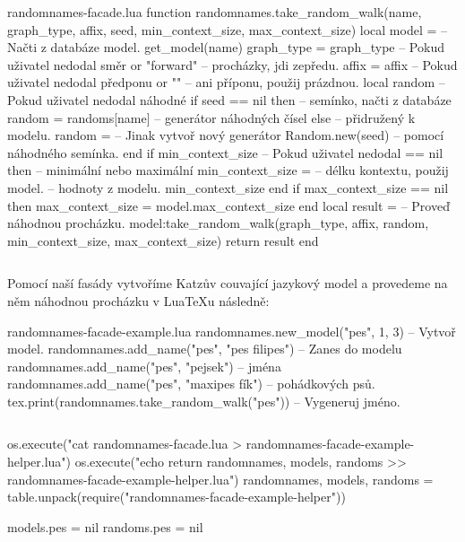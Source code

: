 \documentclass{csbulletin}
\let\exampleoutput\emph
\newcommand\myinputminted[3][]{%
  \inputminted[#1]{#2}{#3}%
}
\newcommand\myinputminted[3][]{%
  \inputminted[#1]{#2}{code-placeholder.#2}%
}
\begin{document}
\begin{filecontents}{randomnames-facade.lua}
function randomnames.take_random_walk(name, graph_type,
                                      affix, seed,
                                      min_context_size,
                                      max_context_size)
  local model =             -- Načti z databáze model.
    get_model(name)
  graph_type = graph_type   -- Pokud uživatel nedodal směr
            or "forward"    -- procházky, jdi zepředu.
  affix = affix             -- Pokud uživatel nedodal předponu
        or ""               -- ani příponu, použij prázdnou.
  local random              -- Pokud uživatel nedodal náhodné
  if seed == nil then       -- semínko, načti z databáze
    random = randoms[name]  -- generátor náhodných čísel
  else                      -- přidružený k modelu.
    random =                -- Jinak vytvoř nový generátor
      Random.new(seed)      -- pomocí náhodného semínka.
  end
  if min_context_size       -- Pokud uživatel nedodal
       == nil then          -- minimální nebo maximální
     min_context_size =     -- délku kontextu, použij
       model.               -- hodnoty z modelu.
         min_context_size
  end
  if max_context_size == nil then
     max_context_size = model.max_context_size
  end
  local result =            -- Proveď náhodnou procházku.
    model:take_random_walk(graph_type, affix, random,
                           min_context_size,
                           max_context_size)
  return result
end
\end{filecontents}
\myinputminted{lua}{randomnames-facade.lua}

Pomocí naší fasády vytvoříme Katzův couvající jazykový model a provedeme na něm náhodnou procházku v Lua\TeX u následně:

\begin{filecontents}{randomnames-facade-example.lua}
randomnames.new_model("pes", 1, 3)              -- Vytvoř model.
randomnames.add_name("pes", "pes filipes")      -- Zanes do modelu
randomnames.add_name("pes", "pejsek")           -- jména
randomnames.add_name("pes", "maxipes fík")      -- pohádkových psů.
tex.print(randomnames.take_random_walk("pes"))  -- Vygeneruj jméno.
\end{filecontents}
\myinputminted[linenos=false]{lua}{randomnames-facade-example.lua}

\noindent
\begin{luacode*}
os.execute("cat randomnames-facade.lua > randomnames-facade-example-helper.lua")
os.execute("echo return {randomnames, models, randoms} >> randomnames-facade-example-helper.lua")
randomnames, models, randoms = table.unpack(require("randomnames-facade-example-helper"))
\end{luacode*}
\exampleoutput{}
\begin{luacode*}
models.pes = nil
randoms.pes = nil
\end{luacode*}
\end{document}

